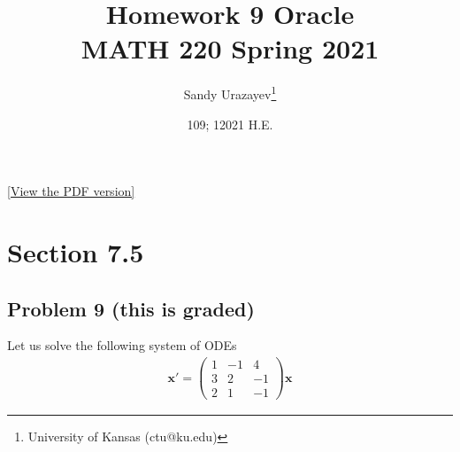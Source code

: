 \documentclass[12pt]{article}
\author{Sandy Urazayev\thanks{University of Kansas (ctu@ku.edu)}}
\date{109; 12021 H.E.}
\title{Homework 9 Oracle\\\medskip
\large MATH 220 Spring 2021}
\begin{document}
\maketitle
\href{./index.pdf}{[View the PDF version]​}

\section*{Section 7.5}
\label{sec:orgb5c7d7f}
\subsection*{Problem 9 (this is graded)}
\label{sec:orgf7adb56}
Let us solve the following system of ODEs
\begin{align*}
        \mathbf{x}' =
        \begin{pmatrix}
                1 & -1 & 4  \\
                3 & 2  & -1 \\
                2 & 1  & -1
        \end{pmatrix} \mathbf{x}
\end{align*}
\end{document}

